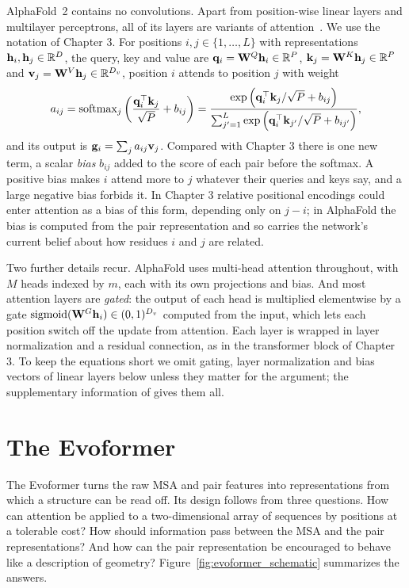 AlphaFold~2 contains no convolutions. Apart from position-wise linear layers and multilayer perceptrons, all of its layers are variants of attention~\citep{vaswani2017}. We use the notation of Chapter 3. For positions $i,j\in\{1,\dots,L\}$ with representations $\mathbf{h}_i,\mathbf{h}_j\in\mathbb{R}^D$, the query, key and value are $\mathbf{q}_i=\mathbf{W}^Q\mathbf{h}_i\in\mathbb{R}^P$, $\mathbf{k}_j=\mathbf{W}^K\mathbf{h}_j\in\mathbb{R}^P$ and $\mathbf{v}_j=\mathbf{W}^V\mathbf{h}_j\in\mathbb{R}^{D_v}$, position $i$ attends to position $j$ with weight
\begin{equation}
  a_{ij} = \operatorname{softmax}_j\left(\frac{\mathbf{q}_i^\top\mathbf{k}_j}{\sqrt{P}} + b_{ij}\right) = \frac{\exp\left(\mathbf{q}_i^\top\mathbf{k}_j/\sqrt{P} + b_{ij}\right)}{\sum_{j'=1}^L\exp\left(\mathbf{q}_i^\top\mathbf{k}_{j'}/\sqrt{P} + b_{ij'}\right)},
  \label{eq:biased_attention}
\end{equation}
and its output is $\mathbf{g}_i=\sum_j a_{ij}\mathbf{v}_j$. Compared with Chapter 3 there is one new term, a scalar \emph{bias} $b_{ij}$ added to the score of each pair before the softmax. A positive bias makes $i$ attend more to $j$ whatever their queries and keys say, and a large negative bias forbids it. In Chapter 3 relative positional encodings could enter attention as a bias of this form, depending only on $j-i$; in AlphaFold the bias is computed from the pair representation and so carries the network's current belief about how residues $i$ and $j$ are related.

Two further details recur. AlphaFold uses multi-head attention throughout, with $M$ heads indexed by $m$, each with its own projections and bias. And most attention layers are \emph{gated}: the output of each head is multiplied elementwise by a gate $\operatorname{sigmoid}(\mathbf{W}^G\mathbf{h}_i)\in(0,1)^{D_v}$ computed from the input, which lets each position switch off the update from attention. Each layer is wrapped in layer normalization and a residual connection, as in the transformer block of Chapter 3. To keep the equations short we omit gating, layer normalization and bias vectors of linear layers below unless they matter for the argument; the supplementary information of \citet{jumper2021} gives them all.

\section{The Evoformer}
\label{sec:evoformer}

The Evoformer turns the raw MSA and pair features into representations from which a structure can be read off. Its design follows from three questions. How can attention be applied to a two-dimensional array of sequences by positions at a tolerable cost? How should information pass between the MSA and the pair representations? And how can the pair representation be encouraged to behave like a description of geometry? Figure~\ref{fig:evoformer_schematic} summarizes the answers.

